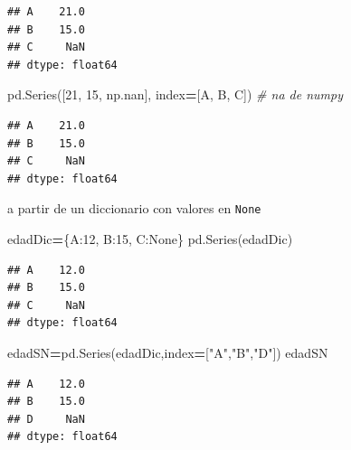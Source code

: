 \documentclass[
]{book}
\newenvironment{Shaded}{\begin{snugshade}}{\end{snugshade}}
\newcommand{\CommentTok}[1]{\textcolor[rgb]{0.56,0.35,0.01}{\textit{#1}}}
\newcommand{\DecValTok}[1]{\textcolor[rgb]{0.00,0.00,0.81}{#1}}
\newcommand{\NormalTok}[1]{#1}
\newcommand{\OperatorTok}[1]{\textcolor[rgb]{0.81,0.36,0.00}{\textbf{#1}}}
\newcommand{\StringTok}[1]{\textcolor[rgb]{0.31,0.60,0.02}{#1}}
\newcommand{\VariableTok}[1]{\textcolor[rgb]{0.00,0.00,0.00}{#1}}
\theoremstyle{definition}
\theoremstyle{definition}
\theoremstyle{definition}
\theoremstyle{definition}
\theoremstyle{remark}
\begin{document}
\begin{verbatim}
## A    21.0
## B    15.0
## C     NaN
## dtype: float64
\end{verbatim}

\begin{Shaded}
\begin{Highlighting}[]
\NormalTok{pd.Series([}\DecValTok{21}\NormalTok{, }\DecValTok{15}\NormalTok{, np.nan], index}\OperatorTok{=}\NormalTok{[}\StringTok{\textquotesingle{}A\textquotesingle{}}\NormalTok{, }\StringTok{\textquotesingle{}B\textquotesingle{}}\NormalTok{, }\StringTok{\textquotesingle{}C\textquotesingle{}}\NormalTok{]) }\CommentTok{\# na de numpy  }
\end{Highlighting}
\end{Shaded}

\begin{verbatim}
## A    21.0
## B    15.0
## C     NaN
## dtype: float64
\end{verbatim}

a partir de un diccionario con valores en \texttt{None}

\begin{Shaded}
\begin{Highlighting}[]
\NormalTok{edadDic}\OperatorTok{=}\NormalTok{\{}\StringTok{\textquotesingle{}A\textquotesingle{}}\NormalTok{:}\DecValTok{12}\NormalTok{, }\StringTok{\textquotesingle{}B\textquotesingle{}}\NormalTok{:}\DecValTok{15}\NormalTok{, }\StringTok{\textquotesingle{}C\textquotesingle{}}\NormalTok{:}\VariableTok{None}\NormalTok{\} }
\NormalTok{pd.Series(edadDic)}
\end{Highlighting}
\end{Shaded}

\begin{verbatim}
## A    12.0
## B    15.0
## C     NaN
## dtype: float64
\end{verbatim}

\begin{Shaded}
\begin{Highlighting}[]
\NormalTok{edadSN}\OperatorTok{=}\NormalTok{pd.Series(edadDic,index}\OperatorTok{=}\NormalTok{[}\StringTok{"A"}\NormalTok{,}\StringTok{"B"}\NormalTok{,}\StringTok{"D"}\NormalTok{])}
\NormalTok{edadSN}
\end{Highlighting}
\end{Shaded}

\begin{verbatim}
## A    12.0
## B    15.0
## D     NaN
## dtype: float64
\end{verbatim}
\end{document}
